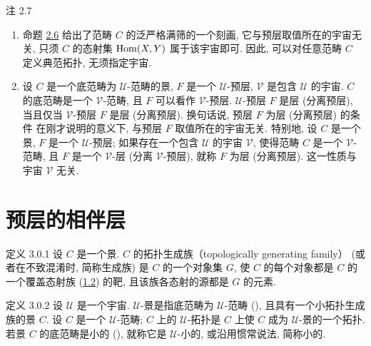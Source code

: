 \begin{enonce*}[remark]{注 2.7}
\begin{enumerate}
\renewcommand{\labelenumi}{\theenumi)}
\item 命题 \hyperref[II.prop2.6]{2.6} 给出了范畴 $C$ 的泛严格满筛的一个刻画,
它与预层取值所在的宇宙无关, 只须 $C$ 的态射集
$\operatorname{Hom}(X,Y)$ 属于该宇宙即可.
因此, 可以对任意范畴 $C$ 定义典范拓扑, 无须指定宇宙.

\item 设 $C$ 是一个底范畴为 $𝒰$-范畴的景,
$F$ 是一个 $𝒰$-预层, $𝒱$ 是包含 $𝒰$ 的宇宙.
$C$ 的底范畴是一个 $𝒱$-范畴, 且 $F$ 可以看作 $𝒱$-预层.
$𝒰$-预层 $F$ 是层 (\resp 分离预层),
当且仅当 $𝒱$-预层 $F$ 是层 (\resp 分离预层).
换句话说, 预层 $F$ 为层 (\resp 分离预层) 的条件
在刚才\pageoriginale{}说明的意义下,
与预层 $F$ 取值所在的宇宙无关.
特别地, 设 $C$ 是一个景, $F$ 是一个 $𝒰$-预层;
如果存在一个包含 $𝒰$ 的宇宙 $𝒱$,
使得范畴 $C$ 是一个 $𝒱$-范畴,
且 $F$ 是一个 $𝒱$-层 (\resp 分离 $𝒱$-预层),
就称 $F$ 为层 (\resp 分离预层).
这一性质与宇宙 $𝒱$ 无关.
\end{enumerate}
\end{enonce*}



\section{预层的相伴层}

\begin{enonce*}{定义 3.0.1}
设 $C$ 是一个景.
$C$ 的拓扑生成族（topologically generating family）
(或者在不致混淆时, 简称生成族) 是 $C$ 的一个对象集 $G$,
使 $C$ 的每个对象都是 $C$ 的一个覆盖态射族
(\hyperref[II.def1.2]{1.2}) 的靶, 且该族各态射的源都是 $G$ 的元素.
\end{enonce*}

\begin{enonce*}{定义 3.0.2}
设 $𝒰$ 是一个宇宙.
$𝒰$-景是指底范畴为 $𝒰$-范畴
{\rm()},
且具有一个小拓扑生成族的景 $C$.
设 $C$ 是一个 $𝒰$-范畴;
$C$ 上的 $𝒰$-拓扑是 $C$ 上使 $C$ 成为 $𝒰$-景的一个拓扑.
若景 $C$ 的底范畴是小的 {\rm()},
就称它是 $𝒰$-小的, 或沿用惯常说法, 简称小的.
\end{enonce*}


